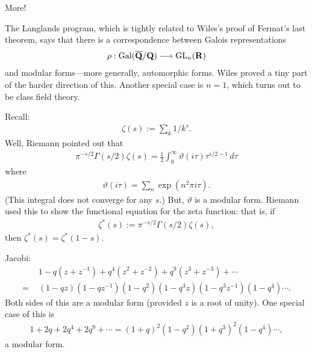 \documentclass[11pt, oneside,margin=1in]{article}
\begin{document}
More!

\begin{example}\label{}\text{}
The Langlands program, which is tightly related to Wiles's proof of Fermat's last theorem, says that there is a correspondence between Galois representations
\begin{align*}
	\rho : \operatorname{Gal}(\overline {\mathbf Q}/\mathbf Q)  \longrightarrow \operatorname{GL}_{n}(\mathbf R)
\end{align*}
and modular forms---more generally, automorphic forms. Wiles proved a tiny part of the harder direction of this. Another special case is $n=1$, which turns out to be class field theory.
\end{example}

\begin{example}\label{}\text{}
Recall:
\begin{align*}
	\zeta(s) :=  \sum_{k}^{} 1/k^s.
\end{align*}
Well, Riemann pointed out that
\begin{align*}
	\pi^{-s/2} \Gamma(s/2) \zeta (s) =  \frac{1}{2}\int_{0}^{\infty} \vartheta(i\tau) \tau^{s/2-1}  \, d\tau 
\end{align*}
where 
\begin{align*}
	\vartheta(i\tau) =  \sum_{n}^{} \exp(n^2\pi i \tau). 
\end{align*}
(This integral does not converge for any $s$.) But, $\vartheta$ is a modular form. Riemann used this to show the functional equation for the zeta function: that is, if 
 \begin{align*}
	\zeta^*(s) := \pi^{-s/2} \Gamma(s/2) \zeta (s),
\end{align*}
then $\zeta^* (s) = \zeta^* (1-s)$.
\end{example}

\begin{example}\label{}\text{}
Jacobi:
\begin{align*}
	&1 - q(z+z^{-1}) + q^4(z^2 + z^{-2}) + q^9  (z^3 + z^{-3}) + \cdots \\ =\,\, & (1-qz) (1-qz^{-1})(1-q^2) (1-q^3z) (1-q^3z^{-1}) (1-q^4)\cdots.
\end{align*}
Both sides of this are a modular form (provided $z$ is a root of unity). One special case of this is
\begin{align*}
	1 + 2q + 2q^4 + 2q^9 + \cdots = (1+q)^2 (1-q^2) (1+q^3)^2 (1-q^4)\cdots,
\end{align*}
a modular form.
\end{example}
	
\end{document}
